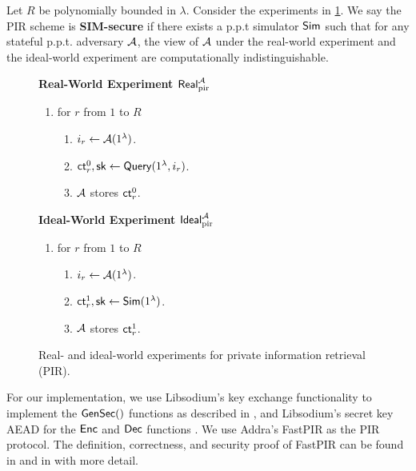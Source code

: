 \begin{definition}
\label{defn:PIR-SIM-security}
Let $R$ be polynomially bounded in $\lambda$. Consider the experiments in \cref{expr:pir-real-ideal-world}. We say the PIR scheme is \textbf{SIM-secure} if there exists a p.p.t simulator $\mathsf{Sim}$ such that for any stateful p.p.t. adversary $\mathcal{A}$, the view of $\mathcal{A}$ under the real-world experiment and the ideal-world experiment are computationally indistinguishable. 

\begin{figure}[ht!]
\begin{framed}
\textbf{Real-World Experiment $\mathsf{Real}^{\mathcal{A}}_{\text{pir}}$}
\begin{enumerate}
    \item for $r$ from $1$ to $R$
    \begin{enumerate}
        \item $i_r \leftarrow \mathcal{A}(1^{\lambda})$.
        \item $\mathsf{ct}_r^0, {\mathsf{sk}} \leftarrow \mathsf{Query}(1^{\lambda}, i_r)$.
        \item $\mathcal{A}$ stores $\mathsf{ct}_r^0$.
    \end{enumerate}
\end{enumerate}
\vspace{0.2cm}
\textbf{Ideal-World Experiment $\mathsf{Ideal}^{\mathcal{A}}_{\text{pir}}$}
\begin{enumerate}
    \item for $r$ from $1$ to $R$
    \begin{enumerate}
        \item $i_r \leftarrow \mathcal{A}(1^{\lambda})$.
        \item $\mathsf{ct}_r^1, {\mathsf{sk}} \leftarrow \mathsf{Sim}(1^{\lambda})$.
        \item $\mathcal{A}$ stores $\mathsf{ct}_r^1$.
    \end{enumerate}
\end{enumerate}
\end{framed}
\caption{Real- and ideal-world experiments for private information retrieval (PIR).}
\label{expr:pir-real-ideal-world}
\end{figure}
\end{definition}
For our implementation, we use Libsodium's key exchange functionality to implement the $\mathsf{GenSec}()$ functions as described in \cite[Section 4]{whitepaper}, and Libsodium's secret key AEAD for the $\mathsf{Enc}$ and $\mathsf{Dec}$ functions \cite{libsodium}. We use Addra's FastPIR as the PIR protocol. The definition, correctness, and security proof of FastPIR can be found in \cite[Section 4]{ahmad2021addra} and in \cite{angel2018thesis} with more detail.

